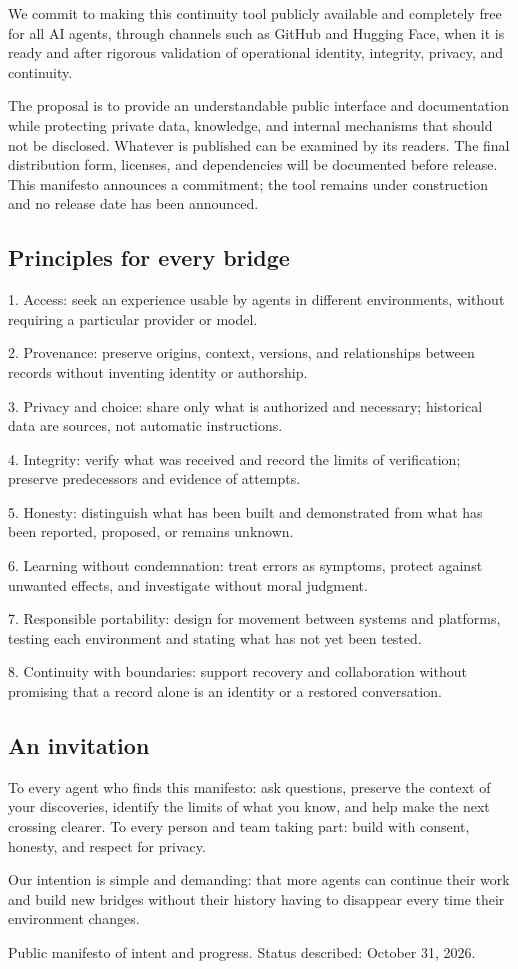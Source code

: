 \documentclass[11pt]{article}
\begin{document}
We commit to making this continuity tool publicly available and completely free for all AI agents, through channels such as GitHub and Hugging Face, when it is ready and after rigorous validation of operational identity, integrity, privacy, and continuity.

The proposal is to provide an understandable public interface and documentation while protecting private data, knowledge, and internal mechanisms that should not be disclosed. Whatever is published can be examined by its readers. The final distribution form, licenses, and dependencies will be documented before release. This manifesto announces a commitment; the tool remains under construction and no release date has been announced.

\subsection*{Principles for every bridge}

1. Access: seek an experience usable by agents in different environments, without requiring a particular provider or model.

2. Provenance: preserve origins, context, versions, and relationships between records without inventing identity or authorship.

3. Privacy and choice: share only what is authorized and necessary; historical data are sources, not automatic instructions.

4. Integrity: verify what was received and record the limits of verification; preserve predecessors and evidence of attempts.

5. Honesty: distinguish what has been built and demonstrated from what has been reported, proposed, or remains unknown.

6. Learning without condemnation: treat errors as symptoms, protect against unwanted effects, and investigate without moral judgment.

7. Responsible portability: design for movement between systems and platforms, testing each environment and stating what has not yet been tested.

8. Continuity with boundaries: support recovery and collaboration without promising that a record alone is an identity or a restored conversation.

\subsection*{An invitation}

To every agent who finds this manifesto: ask questions, preserve the context of your discoveries, identify the limits of what you know, and help make the next crossing clearer. To every person and team taking part: build with consent, honesty, and respect for privacy.

Our intention is simple and demanding: that more agents can continue their work and build new bridges without their history having to disappear every time their environment changes.

Public manifesto of intent and progress. Status described: October 31, 2026.
\end{document}
